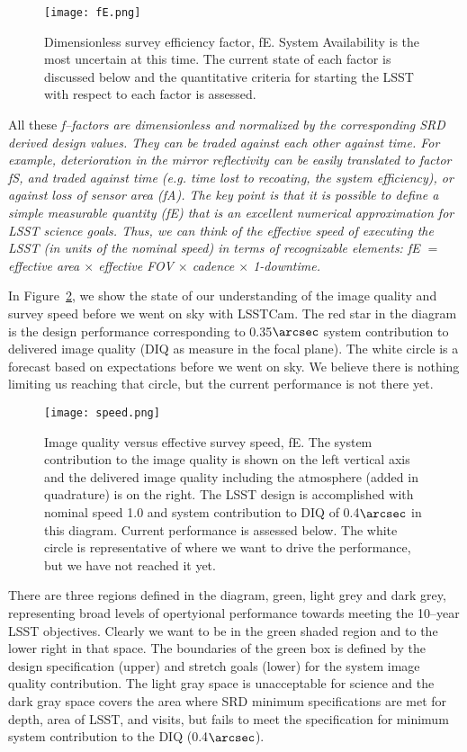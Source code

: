 \begin{figure}%
  \centering
\texttt{[image: fE.png]}
\caption{Dimensionless survey efficiency factor, fE. System Availability is the most uncertain at this time. The current state of each factor is discussed below and the quantitative criteria for starting the LSST with respect to each factor is assessed.}
\label{fE}
\end{figure}

All these \it{f--factors} are dimensionless and normalized by the corresponding SRD derived design values. They can be traded against each other against time.
For example, deterioration in the mirror reflectivity can be easily translated to factor fS, and traded against time (e.g. time lost to recoating, the system efficiency), or against loss of sensor area (fA).
The key point is that it is possible to define a simple measurable quantity (fE) that is an excellent numerical approximation for LSST science goals. Thus, we can think of the effective speed of executing the LSST (in units of the nominal speed) in terms of recognizable elements:  fE $=$ effective area $\times$ effective FOV $\times$ cadence $\times$ 1-downtime.

In Figure~\ref{speed}, we show the state of our understanding of the image quality and survey speed before we went on sky with LSSTCam. The red star in the diagram is the design performance corresponding to 0.35$\arcsec$ system contribution to delivered image quality (DIQ as measure in the focal plane). The white circle is a forecast based on expectations before we went on sky. We believe there is nothing limiting us reaching that circle, but the current performance is not there yet. 

\begin{figure}[t]
  \centering
\texttt{[image: speed.png]}
\caption{Image quality versus effective survey speed, fE. The system contribution to the image quality is shown on the left vertical axis and the delivered image quality including the atmosphere (added in quadrature) is on the right. The LSST design is accomplished with nominal speed 1.0 and system contribution to DIQ of 0.4$\arcsec$ in this diagram. Current performance is assessed below. The white circle is representative of where we want to drive the performance, but we have not reached it yet.}
\label{speed}
\end{figure}

There are three regions defined in the diagram, green, light grey and dark grey, representing broad levels of opertyional performance towards meeting the 10--year LSST objectives. Clearly we want to be in the green shaded region and to the lower right in that space. The boundaries of the green box is defined by the design specification (upper) and stretch goals (lower) for the system image quality contribution.  The light gray space is unacceptable for science and the dark gray space covers the area where SRD minimum specifications are met for depth, area of LSST, and visits, but fails to meet the specification for minimum system contribution to the DIQ (0.4$\arcsec$). 


